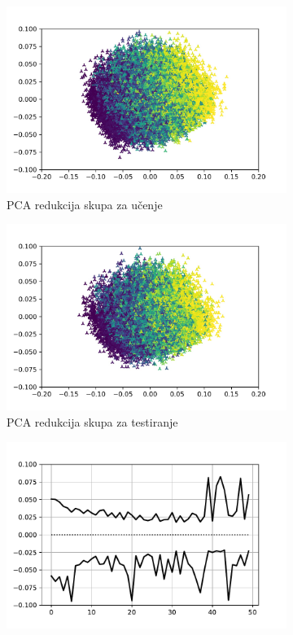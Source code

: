 \documentclass[times, utf8, numeric, diplomski]{fer}
\begin{document}
\begin{figure}[H]
\begin{subfigure}{.5\textwidth}
\includegraphics[width=\textwidth]{ds_nl256_tr_instances.jpg}
\centering
\caption{PCA redukcija skupa za učenje}
\label{fig:dpa2_train_pca}
\end{subfigure}
\begin{subfigure}{.5\textwidth}
\includegraphics[width=\textwidth]{ds_nl256_ts_instances.jpg}
\centering
\caption{PCA redukcija skupa za testiranje}
\label{fig:dpa2_test_pca}
\end{subfigure}
\begin{subfigure}{.5\textwidth}
\includegraphics[width=\textwidth]{ds_nl256_tr_inputs.pdf}

\end{subfigure}
\end{figure}
\end{document}
